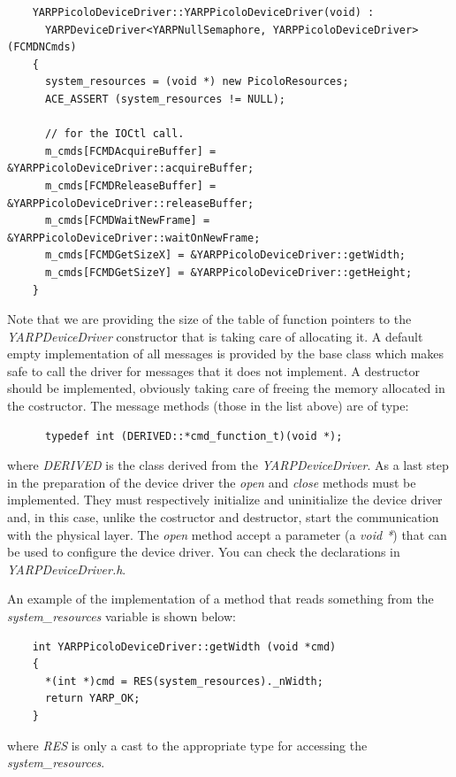 \begin{verbatim}
    YARPPicoloDeviceDriver::YARPPicoloDeviceDriver(void) : 
      YARPDeviceDriver<YARPNullSemaphore, YARPPicoloDeviceDriver>(FCMDNCmds)
    {
      system_resources = (void *) new PicoloResources;
      ACE_ASSERT (system_resources != NULL);

      // for the IOCtl call.
      m_cmds[FCMDAcquireBuffer] = &YARPPicoloDeviceDriver::acquireBuffer;
      m_cmds[FCMDReleaseBuffer] = &YARPPicoloDeviceDriver::releaseBuffer;
      m_cmds[FCMDWaitNewFrame] = &YARPPicoloDeviceDriver::waitOnNewFrame;
      m_cmds[FCMDGetSizeX] = &YARPPicoloDeviceDriver::getWidth;
      m_cmds[FCMDGetSizeY] = &YARPPicoloDeviceDriver::getHeight;
    }
\end{verbatim}

Note that we are providing the size of the table of function pointers to the {\em YARPDeviceDriver} constructor that is taking care of allocating it. A default empty implementation of all messages is provided by the base class which makes safe to call the driver for messages that it does not implement. A destructor should be implemented, obviously taking care of freeing the memory allocated in the costructor. The message methods (those in the list above) are of type:

\begin{verbatim}
      typedef int (DERIVED::*cmd_function_t)(void *); 
\end{verbatim}

\noindent where {\em DERIVED} is the class derived from the {\em YARPDeviceDriver}. As a last step in the preparation of the device driver the {\em open} and {\em close} methods must be implemented. They must respectively initialize and uninitialize the device driver and, in this case, unlike the costructor and destructor, start the communication with the physical layer. The {\em open} method accept a parameter (a {\em void *}) that can be used to configure the device driver. You can check the declarations in {\em YARPDeviceDriver.h}.

An example of the implementation of a method that reads something from the {\em system\_resources} variable is shown below:

\begin{verbatim}
    int YARPPicoloDeviceDriver::getWidth (void *cmd)
    {
      *(int *)cmd = RES(system_resources)._nWidth;
      return YARP_OK;
    }
\end{verbatim}

\noindent where {\em RES} is only a cast to the appropriate type for accessing the {\em system\_resources}.

